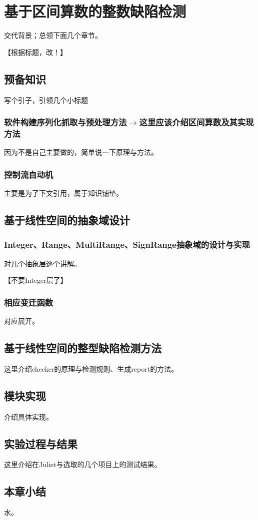 
\chapter{基于区间算数的整数缺陷检测}

交代背景；总领下面几个章节。

【根据标题，改！】

\section{预备知识}

写个引子，引领几个小标题

\subsection{软件构建序列化抓取与预处理方法$\rightarrow$这里应该介绍区间算数及其实现方法}

因为不是自己主要做的，简单说一下原理与方法。

\subsection{控制流自动机}

主要是为了下文引用，属于知识铺垫。

\section{基于线性空间的抽象域设计}

\subsection{Integer、Range、MultiRange、SignRange抽象域的设计与实现}

对几个抽象层逐个讲解。

【不要Integer层了】

\subsection{相应变迁函数}

对应展开。

\section{基于线性空间的整型缺陷检测方法}

这里介绍checker的原理与检测规则、生成report的方法。

\section{模块实现}

介绍具体实现。

\section{实验过程与结果}

这里介绍在Juliet与选取的几个项目上的测试结果。

\section{本章小结}

水。
